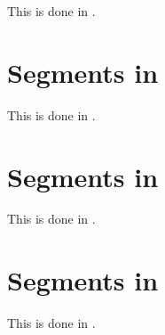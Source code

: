 This is done in \mxsrToMsr{}.


\section{Segments in \msrToMsr{}}

This is done in \msrToMsr{}.


\section{Segments in \msrToLpsr{}}

This is done in \msrToLpsr{}.


\section{Segments in \lpsrToLilypond{}}

This is done in \lpsrToLilypond{}.


